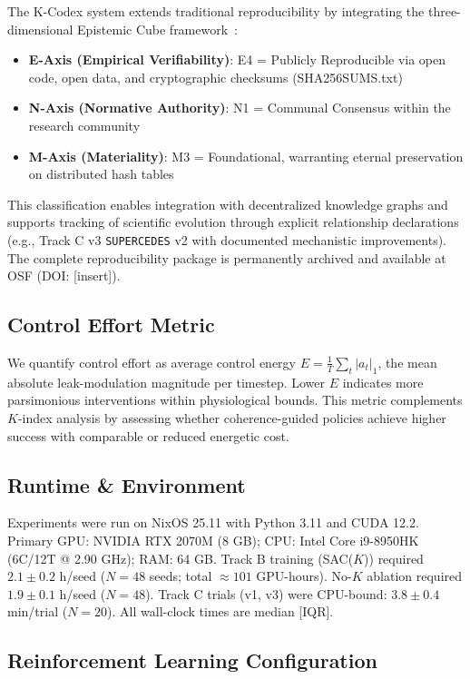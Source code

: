 \documentclass[10pt,letterpaper]{article}
\begin{document}
The K-Codex system extends traditional reproducibility by integrating the three-dimensional Epistemic Cube framework~\cite{mycelix2025epistemic}:
\begin{itemize}
\item \textbf{E-Axis (Empirical Verifiability)}: E4 = Publicly Reproducible via open code, open data, and cryptographic checksums (SHA256SUMS.txt)
\item \textbf{N-Axis (Normative Authority)}: N1 = Communal Consensus within the research community
\item \textbf{M-Axis (Materiality)}: M3 = Foundational, warranting eternal preservation on distributed hash tables
\end{itemize}

This classification enables integration with decentralized knowledge graphs and supports tracking of scientific evolution through explicit relationship declarations (e.g., Track C v3 \texttt{SUPERCEDES} v2 with documented mechanistic improvements). The complete reproducibility package is permanently archived and available at OSF (DOI: [insert]).

\subsection*{Control Effort Metric}

We quantify control effort as average control energy $E = \frac{1}{T}\sum_t |a_t|_1$, the mean absolute leak-modulation magnitude per timestep. Lower $E$ indicates more parsimonious interventions within physiological bounds. This metric complements $K$-index analysis by assessing whether coherence-guided policies achieve higher success with comparable or reduced energetic cost.

\subsection*{Runtime \& Environment}

Experiments were run on NixOS 25.11 with Python 3.11 and CUDA 12.2. Primary GPU: NVIDIA RTX 2070M (8 GB); CPU: Intel Core i9-8950HK (6C/12T @ 2.90 GHz); RAM: 64 GB. Track B training (SAC($K$)) required $2.1 \pm 0.2$ h/seed ($N=48$ seeds; total $\approx 101$ GPU-hours). No-$K$ ablation required $1.9 \pm 0.1$ h/seed ($N=48$). Track C trials (v1, v3) were CPU-bound: $3.8 \pm 0.4$ min/trial ($N=20$). All wall-clock times are median [IQR].

\subsection*{Reinforcement Learning Configuration}
\end{document}
